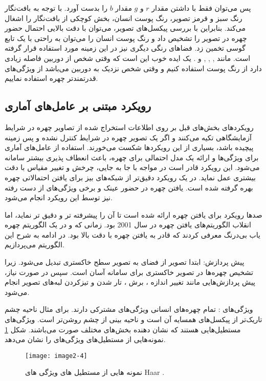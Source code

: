 \noindent
پس می‌توان فقط با داشتن مقدار $r$ و $g$ مقدار $b$ را بدست آورد. با توجه به بافت‌نگار  رنگ سبز و قرمز تصویر، رنگ پوست انسان، بخش کوچکی از بافت‌نگار را اشغال می‌کند. بنابراین با بررسی پیکسل‌های تصویر، می‌توان با دقت بالایی احتمال حضور چهره در تصویر را تشخیص داد و رنگ پوست انسان را می‌توان به راحتی با یک تابع گوسی تخمین زد. فضاهای رنگی دیگری نیز در این زمینه مورد استفاده قرار گرفته است. مانند , , , و . یک ایده خوب این است که وقتی شخص از دوربین فاصله زیادی دارد از رنگ پوست استفاده کنیم و وقتی شخص نزدیک به دوربین می‌باشد از ویژگی‌های قدرتمندتر چهره استفاده نماییم.

\subsection{رویکرد مبتنی بر عامل‌های آماری}
رویکرد‌های بخش‌های قبل بر روی اطلاعات استخراج شده از تصاویر چهره در شرایط آزمایشگاهی تکیه می‌کنند و اگر یک تصویر چهره در شرایط کنترل نشده و پس زمینه پیچیده باشد، بسیاری از این رویکردها شکست می‌خورند. استفاده از عامل‌های آماری  برای ویژگی‌ها و ارائه یک مدل احتمالی برای چهره، باعث انعطاف پذیری بیشتر سامانه می‌شود. این رویکرد قادر است در مواجه با جا به جایی، چرخش و تغییر مقیاس با دقت بیشتری عمل نماید. در یک رویکرد دقیق‌تر از شبکه‌های بیز  برای یافتن احتمالاتی چهره بهره گرفته شده است. یافتن چهره در حضور عینک و برخی ویژگی‌های از دست رفته نیز توسط این رویکرد انجام می‌شود.

\noindent
صدها رویکرد برای یافتن چهره ارائه شده است تا آن را پیشرفته تر و دقیق تر نماید، اما انقلاب الگوریتم‌های یافتن چهره در سال 2001 بود. زمانی که  و  در \cite{990517} یک الگوریتم چهره یاب بی‌درنگ معرفی کردند که قادر به یافتن چهره با دقت بالا بود. در ادامه به شرح این الگوریتم می‌پردازیم.

\noindent
پیش پردازش: ابتدا تصویر از فضای  به تصویر سطح خاکستری تبدیل می‌شود. زیرا تشخیص چهره‌ها در تصویر خاکستری برای سامانه آسان است. سپس در صورت نیاز، پیش پردازش‌هایی مانند تغییر اندازه ، برش ، تار شدن  و تیزکردن لبه‌های تصویر  انجام می‌شود. 

\noindent
ویژگی‌های : تمام چهره‌های انسانی ویژگی‌های مشترکی دارند. برای مثال ناحیه چشم تاریک‌تر از پیکسل‌های همسایه آن است و ناحیه بینی از چشم روشن‌تر است. ویژگی‌های  مستطیل‌هایی هستند که نشان دهنده بخش‌های مختلف صورت می‌باشند. شکل \ref{image2-4} نمونه‌هایی از مستطیل‌های ویژگی‌های  را نشان می‌دهد.
\begin{figure}[h]
\centering
  \texttt{[image: image2-4]}
  \caption{نمونه هایی از مستطیل های ویژگی های Haar \cite{990517}.}
  \label{image2-4}
\end{figure}


